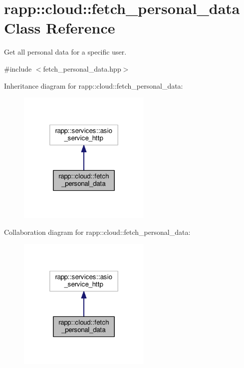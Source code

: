 \hypertarget{classrapp_1_1cloud_1_1fetch__personal__data}{\section{rapp\-:\-:cloud\-:\-:fetch\-\_\-personal\-\_\-data Class Reference}
\label{classrapp_1_1cloud_1_1fetch__personal__data}
}


Get all personal data for a specific user.  




{\ttfamily \#include $<$fetch\-\_\-personal\-\_\-data.\-hpp$>$}



Inheritance diagram for rapp\-:\-:cloud\-:\-:fetch\-\_\-personal\-\_\-data\-:
\nopagebreak
\begin{figure}[H]
\begin{center}
\leavevmode
\includegraphics[width=180pt]{classrapp_1_1cloud_1_1fetch__personal__data__inherit__graph}
\end{center}
\end{figure}


Collaboration diagram for rapp\-:\-:cloud\-:\-:fetch\-\_\-personal\-\_\-data\-:
\nopagebreak
\begin{figure}[H]
\begin{center}
\leavevmode
\includegraphics[width=180pt]{classrapp_1_1cloud_1_1fetch__personal__data__coll__graph}
\end{center}
\end{figure}
